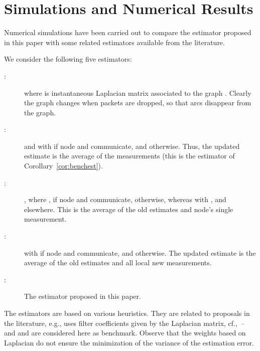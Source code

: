 \documentclass[a4paper,notitlepage,onecolumn]{article}
\numberwithin{equation}{section}
\begin{document}
\section{Simulations and Numerical Results} \label{sec:simulations}

Numerical simulations have been carried out to compare the
estimator proposed in this paper with some related estimators
available from the literature.

We consider the following five estimators:
\begin{description}
  \item[:]  where  is instantaneous Laplacian matrix
  associated to the graph . Clearly the graph changes when packets are dropped, so that arcs disappear from the graph.
  \item[:]  and  with
       if node  and
       communicate, and  otherwise. Thus, the
      updated estimate is the  average of the measurements
      (this is the estimator of Corollary~\ref{cor:benchest}).
  \item[:] , where ,
 if node  and  communicate,  otherwise, whereas 
  with , and  elsewhere. This is the average of the old estimates and node's single measurement.
  \item[:]  with
 if node  and 
communicate, and  otherwise. The updated estimate is the
average of the old estimates and all local new measurements.
   \item[:] The estimator proposed in this paper.
\end{description}
The estimators  are based on various heuristics.
They are related to proposals in the literature, e.g., 
uses filter coefficients given by the Laplacian matrix,
cf.,~\cite{XiaoBoydLall}--\cite{Olfati05} and  and  are
considered here as benchmark. Observe that the weights based on
Laplacian do not ensure the minimization of the variance of the
estimation error.
\end{document}

